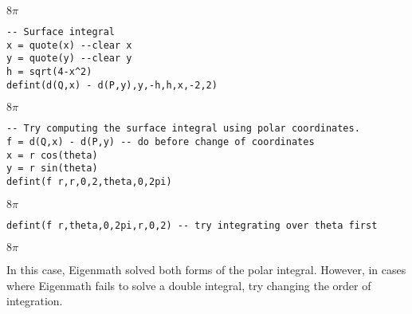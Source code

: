 \noindent
$\displaystyle 8\pi$

\begin{Verbatim}[formatcom=\color{blue},samepage=true]
-- Surface integral
x = quote(x) --clear x
y = quote(y) --clear y
h = sqrt(4-x^2)
defint(d(Q,x) - d(P,y),y,-h,h,x,-2,2)
\end{Verbatim}

\noindent
$\displaystyle 8\pi$

\begin{Verbatim}[formatcom=\color{blue},samepage=true]
-- Try computing the surface integral using polar coordinates.
f = d(Q,x) - d(P,y) -- do before change of coordinates
x = r cos(theta)
y = r sin(theta)
defint(f r,r,0,2,theta,0,2pi)
\end{Verbatim}

\noindent
$\displaystyle 8\pi$

\begin{Verbatim}[formatcom=\color{blue},samepage=true]
defint(f r,theta,0,2pi,r,0,2) -- try integrating over theta first
\end{Verbatim}

\noindent
$\displaystyle 8\pi$

\bigskip
\noindent
In this case, Eigenmath solved both forms of the polar integral.
However, in cases where Eigenmath fails to solve a double integral, try
changing the order of integration.
